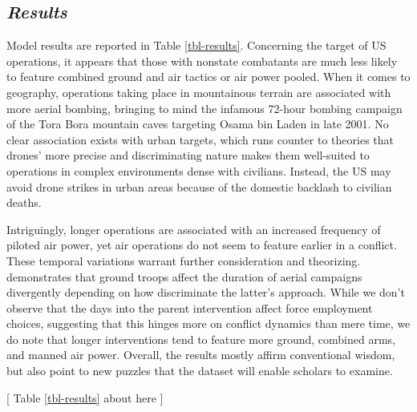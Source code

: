 \documentclass[fleqn,12pt]{article}
\begin{document}
\subsection*{\textit{Results}}
Model results are reported in Table \ref{tbl-results}. Concerning the target of US operations, it appears that those with nonstate combatants are much less likely to feature combined ground and air tactics or air power pooled. When it comes to geography, operations taking place in mountainous terrain are associated with more aerial bombing, bringing to mind the infamous 72-hour bombing campaign of the Tora Bora mountain caves targeting Osama bin Laden in late 2001. No clear association exists with urban targets, which runs counter to theories that drones' more precise and discriminating nature makes them well-suited to operations in complex environments dense with civilians. Instead, the US may avoid drone strikes in urban areas because of the domestic backlash to civilian deaths.

Intriguingly, longer operations are associated with an increased frequency of piloted air power, yet air operations do not seem to feature earlier in a conflict. These temporal variations warrant further consideration and theorizing. \citet{martinezmachain_aircampaignduration_2015} demonstrates that ground troops affect the duration of aerial campaigns divergently depending on how discriminate the latter's approach. While we don't observe that the days into the parent intervention affect force employment choices, suggesting that this hinges more on conflict dynamics than mere time, we do note that longer interventions tend to feature more ground, combined arms, and manned air power. Overall, the results mostly affirm conventional wisdom, but also point to new puzzles that the dataset will enable scholars to examine.

\begin{center}
	[ Table \ref{tbl-results} about here ]
\end{center}
\end{document}
